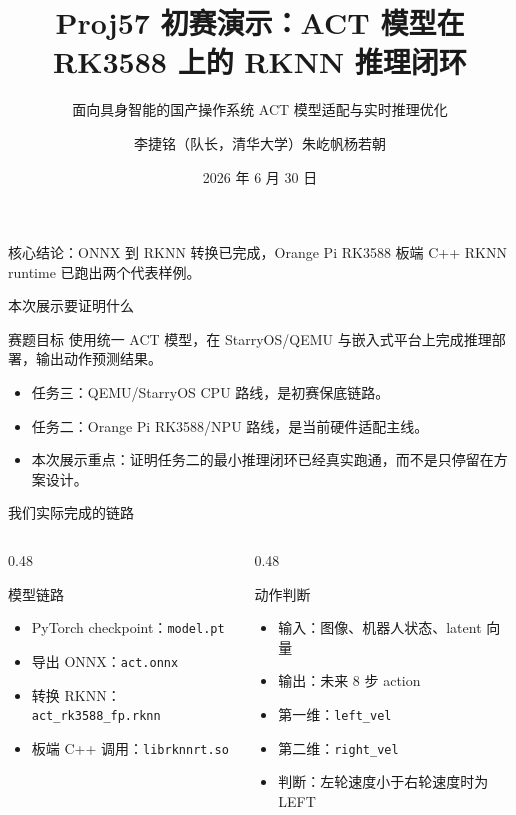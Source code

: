 \documentclass[aspectratio=169,11pt]{ctexbeamer}
\title[Proj57 初赛演示]{Proj57 初赛演示：ACT 模型在 RK3588 上的 RKNN 推理闭环}
\subtitle{面向具身智能的国产操作系统 ACT 模型适配与实时推理优化}
\author{李捷铭（队长，清华大学）\quad 朱屹帆\quad 杨若朝}
\institute{OS 功能挑战赛道 Proj57}
\date{2026 年 6 月 30 日}
\newcommand{\code}[1]{\texttt{\small #1}}
\begin{document}
\begin{frame}
  \titlepage
  \vspace{-0.6em}
  \begin{center}
    \small 核心结论：ONNX 到 RKNN 转换已完成，Orange Pi RK3588 板端 C++ RKNN runtime 已跑出两个代表样例。
  \end{center}
\end{frame}

\begin{frame}{本次展示要证明什么}
  \begin{block}{赛题目标}
    使用统一 ACT 模型，在 StarryOS/QEMU 与嵌入式平台上完成推理部署，输出动作预测结果。
  \end{block}
  \begin{itemize}
    \item 任务三：QEMU/StarryOS CPU 路线，是初赛保底链路。
    \item 任务二：Orange Pi RK3588/NPU 路线，是当前硬件适配主线。
    \item 本次展示重点：证明任务二的最小推理闭环已经真实跑通，而不是只停留在方案设计。
  \end{itemize}
\end{frame}

\begin{frame}{我们实际完成的链路}
  \begin{columns}[T,onlytextwidth]
    \begin{column}{0.48\textwidth}
      \begin{block}{模型链路}
        \begin{itemize}
          \item PyTorch checkpoint：\code{model.pt}
          \item 导出 ONNX：\code{act.onnx}
          \item 转换 RKNN：\code{act\_rk3588\_fp.rknn}
          \item 板端 C++ 调用：\code{librknnrt.so}
        \end{itemize}
      \end{block}
    \end{column}
    \begin{column}{0.48\textwidth}
      \begin{block}{动作判断}
        \begin{itemize}
          \item 输入：图像、机器人状态、latent 向量
          \item 输出：未来 8 步 action
          \item 第一维：\code{left\_vel}
          \item 第二维：\code{right\_vel}
          \item 判断：左轮速度小于右轮速度时为 LEFT
        \end{itemize}
      \end{block}
    \end{column}
  \end{columns}
\end{frame}
\end{document}
